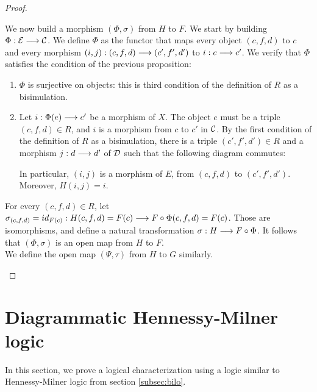 \begin{proof}
\begin{itemize}
We now build a morphism $(\Phi, \sigma)$ from $H$ to $F$.  We start by
building $\Phi : \mathcal{E} \longrightarrow \mathcal{C}$.  We define $\Phi$ as the functor that
maps every object $(c,f,d)$ to $c$ and every morphism
$(i,j) : (c,f,d) \longrightarrow (c',f',d')$ to $i : c \longrightarrow c'$.  We
verify that $\Phi$ satisfies the condition of the previous proposition:
\begin{enumerate}
\item $\Phi$ is surjective on objects: this is third condition of the
  definition of $R$ as a bisimulation.
\item Let $i : \Phi (e) \longrightarrow c'$ be a morphism of $X$.  The object
  $e$ must be a triple $(c,f,d) \in R$, and $i$ is a morphism from
  $c$ to $c'$ in $\mathcal{C}$.  By the first condition of the definition of $R$ as a
  bisimulation, there is a triple $(c',f',d') \in R$ and a morphism
  $j : d \longrightarrow d'$ of $\mathcal{D}$ such that the following diagram commutes:
\begin{center}
\end{center}
  In particular, $(i,j)$ is a morphism of $E$, from $(c,f,d)$ to
  $(c',f',d')$.  Moreover, $H(i,j) = i$.
\end{enumerate}
For every $(c,f,d)\in R$, let $\sigma_{(c,f,d)} =
  id_{F(c)} : H(c,f,d) = F(c) \longrightarrow F\circ\Phi(c,f,d) = F(c)$.  Those
are isomorphisms, and define a natural transformation
$\sigma : H \longrightarrow F\circ\Phi$.  It follows that $(\Phi,\sigma)$ is an
open map from $H$ to $F$.\\
We define the open map $(\Psi, \tau)$ from $H$ to $G$ similarly.
\end{itemize}
\end{proof}





\section{Diagrammatic Hennessy-Milner logic}

In this section, we prove a logical characterization using a logic similar to Hennessy-Milner logic from section \ref{subsec:bilo}.

